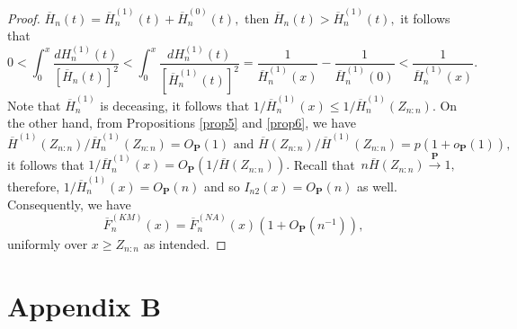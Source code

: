 \documentclass[reqno,openbib,runningheads,a4paper,12pt]{amsart}%
\begin{document}
\begin{proof}
$\overline{H}_{n}\left(  t\right)  =\overline{H}_{n}^{\left(  1\right)
}\left(  t\right)  +\overline{H}_{n}^{\left(  0\right)  }\left(  t\right)  ,$
then $\overline{H}_{n}\left(  t\right)  >\overline{H}_{n}^{\left(  1\right)
}\left(  t\right)  ,$ it follows that%
\[
0<\int_{0}^{x}\frac{dH_{n}^{\left(  1\right)  }\left(  t\right)  }{\left[
\overline{H}_{n}\left(  t\right)  \right]  ^{2}}<\int_{0}^{x}\frac
{dH_{n}^{\left(  1\right)  }\left(  t\right)  }{\left[  \overline{H}%
_{n}^{\left(  1\right)  }\left(  t\right)  \right]  ^{2}}=\frac{1}%
{\overline{H}_{n}^{\left(  1\right)  }\left(  x\right)  }-\frac{1}%
{\overline{H}_{n}^{\left(  1\right)  }\left(  0\right)  }<\frac{1}%
{\overline{H}_{n}^{\left(  1\right)  }\left(  x\right)  }.
\]
Note that $\overline{H}_{n}^{\left(  1\right)  }$ is deceasing, it follows
that $1/\overline{H}_{n}^{\left(  1\right)  }\left(  x\right)  \leq
1/\overline{H}_{n}^{\left(  1\right)  }\left(  Z_{n:n}\right)  .$ On the other
hand, from Propositions \ref{prop5} and \ref{prop6}, we have
\[
\overline{H}^{\left(  1\right)  }\left(  Z_{n:n}\right)  /\overline{H}%
_{n}^{\left(  1\right)  }\left(  Z_{n:n}\right)  =O_{\mathbf{P}}\left(
1\right)  \text{ and }\overline{H}\left(  Z_{n:n}\right)  /\overline
{H}^{\left(  1\right)  }\left(  Z_{n:n}\right)  =p\left(  1+o_{\mathbf{P}%
}\left(  1\right)  \right)  ,
\]
it follows that $1/\overline{H}_{n}^{\left(  1\right)  }\left(  x\right)
=O_{\mathbf{P}}\left(  1/\overline{H}\left(  Z_{n:n}\right)  \right)  .$
Recall that\ $n\overline{H}\left(  Z_{n:n}\right)  \overset{\mathbf{P}%
}{\rightarrow}1,$ therefore, $1/\overline{H}_{n}^{\left(  1\right)  }\left(
x\right)  =O_{\mathbf{P}}\left(  n\right)  $ and so $I_{n2}\left(  x\right)
=O_{\mathbf{P}}\left(  n\right)  $ as well. Consequently, we have%
\[
\overline{F}_{n}^{\left(  KM\right)  }\left(  x\right)  =\overline{F}%
_{n}^{\left(  NA\right)  }\left(  x\right)  \left(  1+O_{\mathbf{P}}\left(
n^{-1}\right)  \right)  ,
\]
uniformly over $x\geq Z_{n:n}$ as intended.
\end{proof}

\newpage

\section{\textbf{Appendix B \label{Appendix B}}}%
\end{document}
